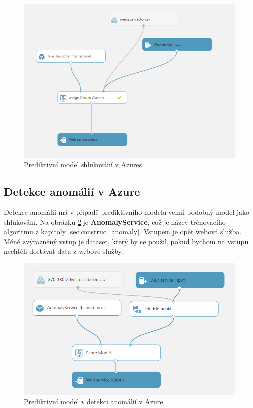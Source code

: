 \documentclass[thesis=M,czech]{FITthesis}[2012/10/20]
\newcommand{\tmpframe}[1]{\fbox{#1}}
\renewcommand{\tmpframe}[1]{#1}
\begin{document}
		\begin{figure}[htb]\centering
			\tmpframe{\includegraphics[width=\textwidth]{./img/azureK-meansPredict}}	
			\caption{Prediktivní model shlukování v Azures}
			\label{fig:predict_clustering_azure}
		\end{figure}
		
		\subsection{Detekce anomálií v Azure}
			Detekce anomálií má v případě prediktivního modelu velmi podobný model jako shlukování. Na obrázku \ref{fig:predict_anomaly_azure} je \textbf{AnomalyService}, což je název trénovacího algoritmu z kapitoly \ref{sec:construc_anomaly}. Vstupem je opět webová služba. Méně zvýrazněný vstup je dataset, který by se použil, pokud bychom na vstupu nechtěli dostávat data z webové služby.
			 
		\begin{figure}[htb]\centering
			\includegraphics[width=\textwidth]{./img/azureAnomalyPredict}
			\caption{Prediktivní model v detekci anomálií v Azure}
			\label{fig:predict_anomaly_azure}
		\end{figure}
	
\end{document}
